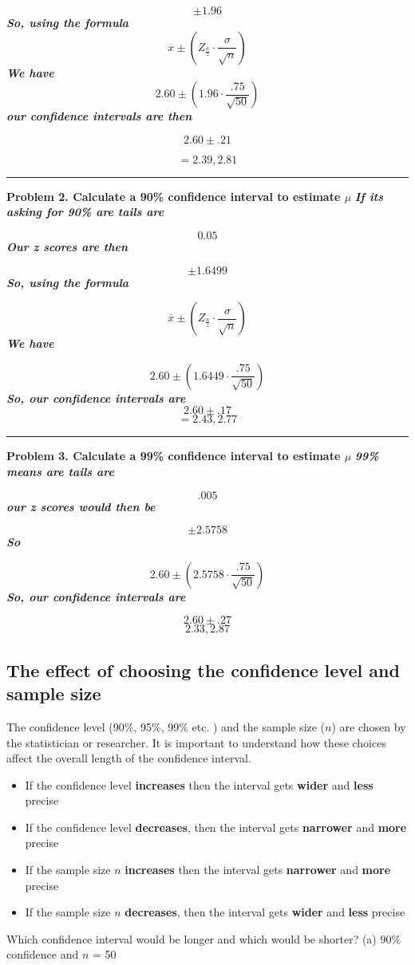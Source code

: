 \documentclass{report}
\begin{document}
$$ \pm 1.96$$
\textit{\textbf{So, using the formula}}
$$ \overline{x}\pm \left(Z_{\frac{a}{z}}\cdot \frac{\sigma}{\sqrt{n}}\right)$$
\textit{\textbf{We have}}
$$ 2.60\pm(1.96\cdot\dfrac{.75}{\sqrt{50}})$$
\textit{\textbf{our confidence intervals are then}}

$$ 2.60 \pm .21$$

$$ = 2.39, 2.81$$
\bigbreak \noindent \bigbreak \noindent
\hrule
\bigbreak \noindent
\textbf{Problem 2. Calculate a 90\% confidence interval to estimate $\mu$}
\bigbreak \noindent
\textit{\textbf{If its asking for 90\% are tails are}}

$$ 0.05$$
\textit{\textbf{Our z scores are then}}

$$\pm{1.6499}$$
\textit{\textbf{So, using the formula}}

$$ \overline{x}\pm \left(Z_{\frac{a}{z}}\cdot \frac{\sigma}{\sqrt{n}}\right)$$
\textit{\textbf{We have}}

$$ 2.60\pm(1.6449 \cdot\dfrac{.75}{\sqrt{50}})$$
\textit{\textbf{So, our confidence intervals are}}
$$ 2.60\pm{.17}$$
$$ = 2.43, 2.77$$
\bigbreak \noindent \bigbreak \noindent
\hrule
\bigbreak \noindent
\textbf{Problem 3. Calculate a 99\% confidence interval to estimate $\mu$}
\bigbreak \noindent
\textit{\textbf{99\% means are tails are}}

$$.005$$
\textit{\textbf{our z scores would then be}}

$$\pm{2.5758}$$
\textit{\textbf{So}}

$$2.60\pm(2.5758\cdot\dfrac{.75}{\sqrt{50}})$$
\textit{\textbf{So, our confidence intervals are}}

$$ 2.60\pm{.27}$$
$$ 2.33, 2.87$$

\pagebreak
\subsection*{The effect of choosing the confidence level and sample size}
The confidence level (90\%, 95\%, 99\% etc. ) and the sample size ($n$) are chosen by the statistician or researcher. It is important to understand how these choices affect the overall length of the confidence interval.
\bigbreak \noindent
\begin{itemize}
  \item If the confidence level \textbf{increases} then the interval gets \textbf{wider} and \textbf{less} precise
  \item If the confidence level \textbf{decreases}, then the interval gets \textbf{narrower} and \textbf{more }precise
  \item If the sample size $n$ \textbf{increases} then the interval gets \textbf{narrower} and \textbf{more} precise
  \item If the sample size $n$ \textbf{decreases}, then the interval gets \textbf{wider} and \textbf{less} precise
\end{itemize}
\bigbreak \noindent
\q
Which confidence interval would be longer and which would be shorter?
\bigbreak \noindent
(a) 90\% confidence and $n$ = 50 
\vspace{1mm}
\end{document}
